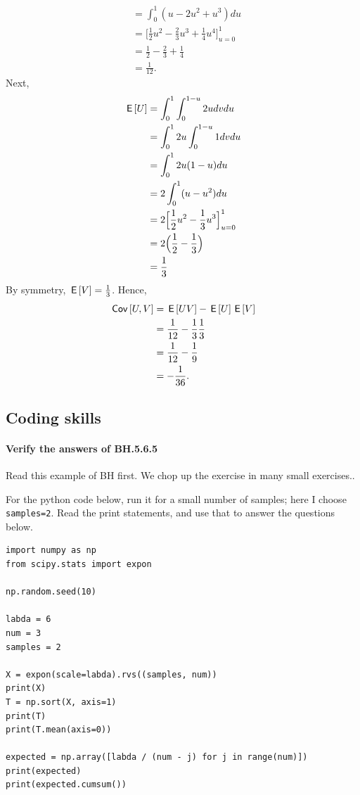\documentclass[assignments]{subfiles}
\begin{document}
\begin{exercise}
\begin{solution}
\begin{enumerate}
\begin{align}
        &= \int_0^1 (u - 2u^2 + u^3) du \\
        &= \Big[ \frac{1}{2}u^2 - \frac{2}{3}u^3 + \frac{1}{4}u^4 \Big]_{u=0}^1 \\
        &= \frac{1}{2} - \frac{2}{3} + \frac{1}{4} \\
        &= \frac{1}{12}.
    \end{align}
    Next,
    \begin{align}
        \,\mathsf{E}\left[U\right] &= \int_0^1 \int_0^{1-u} 2 u dv du \\
        &= \int_0^1 2 u \int_0^{1-u} 1 dv du \\
        &= \int_0^1 2 u(1-u) du \\
        &= 2 \int_0^1 (u - u^2) du \\
        &= 2  \Big[\frac{1}{2}u^2 - \frac{1}{3}u^3\Big]_{u=0}^1 \\
        &= 2 \Big(\frac{1}{2} - \frac{1}{3}\Big) \\
        &= \frac{1}{3}
    \end{align}
    By symmetry, $\,\mathsf{E}\left[V\right] = \frac{1}{3}$. Hence,
    \begin{align}
        \,\mathsf{Cov}\left[U,V\right] &= \,\mathsf{E}\left[UV\right] - \,\mathsf{E}\left[U\right]\,\mathsf{E}\left[V\right] \\
        &= \frac{1}{12} - \frac{1}{3}\frac{1}{3}\\
        &= \frac{1}{12} - \frac{1}{9} \\
        &= -\frac{1}{36}.
    \end{align}
\end{enumerate}
\end{solution}
\end{exercise}


\subsection{Coding skills}


\paragraph{Verify the answers of BH.5.6.5}
Read this example of BH first.
We chop up the exercise in many small exercises..


For the python code below, run it for a small number of samples; here I choose \texttt{samples=2}. Read the print statements, and use that to answer the questions below.

\begin{verbatim}
import numpy as np
from scipy.stats import expon

np.random.seed(10)

labda = 6
num = 3
samples = 2

X = expon(scale=labda).rvs((samples, num))
print(X)
T = np.sort(X, axis=1)
print(T)
print(T.mean(axis=0))

expected = np.array([labda / (num - j) for j in range(num)])
print(expected)
print(expected.cumsum())
\end{verbatim}
\end{document}
